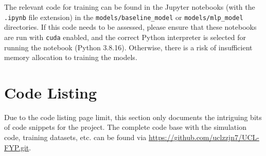 \documentclass[11pt, a4paper]{report}
\begin{document}
The relevant code for training can be found in the Jupyter notebooks (with the \verb|.ipynb| file extension) in the \verb|models/baseline_model| or \verb|models/mlp_model| directories. If this code needs to be assessed, please ensure that these notebooks are run with \verb|cuda| enabled, and the correct Python interpreter is selected for running the notebook (Python 3.8.16). Otherwise, there is a risk of insufficient memory allocation to training the models.



\chapter{Code Listing}\label{apdx:3}
Due to the code listing page limit, this section only documents the intriguing bits of code snippets for the project. The complete code base with the simulation code, training datasets, etc. can be found via \href{https://github.com/uclzzjn7/UCL-FYP.git}{https://github.com/uclzzjn7/UCL-FYP.git}.
\end{document}
